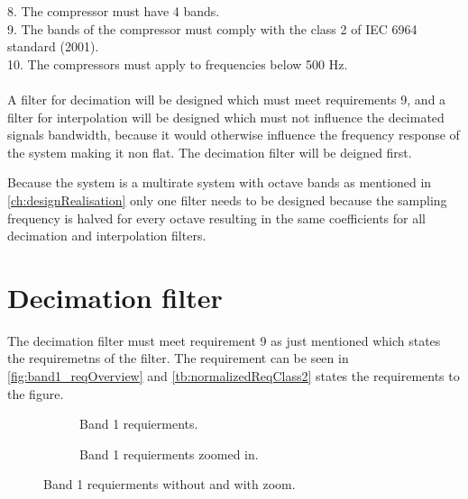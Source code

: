 8. The compressor must have 4 bands. \\
9. The bands of the compressor must comply with the class 2 of IEC 6964 standard (2001). \\
10. The compressors must apply to frequencies below 500 Hz. \\
\\ 
A filter for decimation will be designed which must meet requirements 9, and a filter for interpolation will be designed which must not influence the decimated signals bandwidth, because it would otherwise influence the frequency response of the system making it non flat. The decimation filter will be deigned first.

Because the system is a multirate system with octave bands as mentioned in \autoref{ch:designRealisation} only one filter needs to be designed because the sampling frequency is halved for every octave resulting in the same coefficients for all decimation and interpolation filters.

\section{Decimation filter}\label{sec:decFilter}
The decimation filter must meet requirement 9 as just mentioned which states the requiremetns of the filter. The requirement can be seen in \autoref{fig:band1_reqOverview} and \autoref{tb:normalizedReqClass2} states the requirements to the figure.

\begin{figure}[H]
\centering
\begin{subfigure}[t]{0.45\textwidth}
	
	\caption{Band 1 requierments.}
	\label{fig:band1_req}
\end{subfigure}
\begin{subfigure}[t]{0.45\textwidth}
	
	\caption{Band 1 requierments zoomed in.}
	\label{fig:band1_reqZoom}
\end{subfigure}
\caption{Band 1 requierments without and with zoom.}
\label{fig:band1_reqOverview}
\end{figure}


